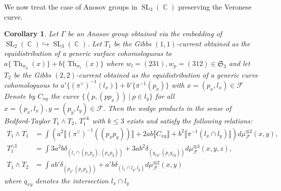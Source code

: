 \documentclass[12pt]{amsbook}%
\newtheorem{cor}[thm]{Corollary}
\theoremstyle{definition}
\theoremstyle{remark}
\numberwithin{section}{chapter}
\numberwithin{subsection}{section}
\numberwithin{figure}{chapter}
\DeclareMathOperator{\C}{\mathbb{C}}
\DeclareMathOperator{\SL}{SL}
\DeclareMathOperator{\Th}{Th}
\newcommand\intcur[1]{\llbracket #1 \rrbracket}
\def\cF{{\mathscr{F}}}
\def\Ga{\Gamma}
\begin{document}
{{We now treat the case of Anosov groups in $\SL_3(\C)$ preserving the Veronese curve.

\begin{cor} Let $\Ga$ be an Anosov group obtained via the embedding of $\SL_2(\C) \hookrightarrow \SL_3(\C)$. Let $T_1$ be the Gibbs  $(1,1)$-current obtained as the equidistribution of a generic surface cohomologuous to $ a  \{ \Th_{w_p}(x) \} + b \{ \Th_{w_l}(x) \}$ where $w_l = (231), w_p = (312) \in \mathfrak{S}_3$ and let $T_2$ be the Gibbs $(2,2)$-current obtained as the equidistribution of a generic curve cohomologuous to $ a'  \{ (\pi^{\vee})^{-1}(l_x) \} + b'\{ \pi^{-1}(p_x)\}$ with $x = (p_x, l_x)\in \cF$
Denote by $C_{xy}$ the curve $\{ (p, (p p_x)) \ | \ p \in l_y \}$ for all $x = (p_x, l_x), y = (p_y, l_y)  \in \cF$.  
Then the wedge products in the sense of Bedford-Taylor $T_1 \wedge T_2$, $T_1^{\wedge k}$ with $k\leqslant 3$ exists and satisfy the following relations:  
   \begin{align*}
   T_1 \wedge T_1 & = \int \left (  a^2 \intcur{(\pi^{\vee})^{-1}((p_x p_y))}  + 2 ab \intcur{C_{xy}} + b^2 \intcur{\pi^{-1}(l_x \cap l_y)} \right ) d\mu_{\cF}^{\otimes 2}(x,y), \\
   T_1^{\wedge 3} & = \int 3 a^2 b \delta_{(l_z \cap (p_x p_y), (p_x p_y))} + 3 a b^2 \delta_{(q_{x y}, (p_z q_{x y}))} d\mu_{\cF}^{\otimes 3}(x,y,z) ,\\
   T_1 \wedge T_2  & = \int ab'  \delta_{(p_y, (p_x p_y))} + a' b \delta_{(l_x \cap l_y,l_y)}  d\mu^{\otimes 2}_{\cF}(x,y)
   \end{align*}
   where $q_{xy}$ denotes the intersection $l_x\cap l_y$
\end{cor}

}}
\end{document}
